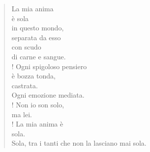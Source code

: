 
\begin{verse}
La mia anima\\
è sola\\
in questo mondo,\\
separata da esso\\
con scudo\\
di carne e sangue.\\!
Ogni spigoloso pensiero\\
è bozza tonda,\\
castrata.\\
Ogni emozione mediata.\\!
Non io son solo,\\
ma lei.\\!
La mia anima è\\
sola.\\
Sola, tra i tanti che non la lasciano mai sola.\\
\end{verse}